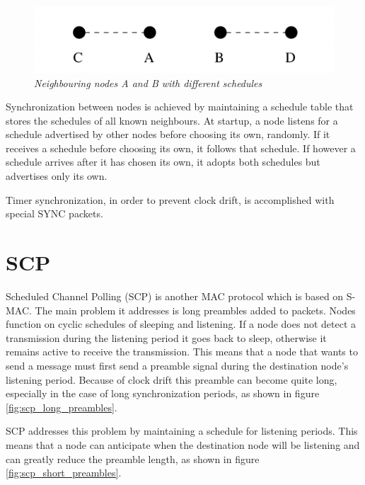 \begin{figure}[ht]
	\begin{center}
		\includegraphics{img/s-mac_schedules.pdf}
	\end{center}
	\caption{\small \itshape{Neighbouring nodes A and B with different
	schedules\protect\footnotemark}}
	\label{fig:s-mac_schedules}
\end{figure}

Synchronization between nodes is achieved by maintaining a schedule table that
stores the schedules of all known neighbours. At startup, a node listens for a
schedule advertised by other nodes before choosing its own, randomly. If it
receives a schedule before choosing its own, it follows that schedule. If
however a schedule arrives after it has chosen its own, it adopts both schedules
but advertises only its own.

Timer synchronization, in order to prevent clock drift, is
accomplished with special SYNC packets.

\section{SCP}

Scheduled Channel Polling\cite{ye2006ultra} (SCP) is another MAC protocol which
is based on S-MAC. The main problem it addresses is long preambles added to
packets. Nodes function on cyclic schedules of sleeping and listening. If a
node does not detect a transmission during the listening period it goes back to
sleep, otherwise it remains active to receive the transmission. This means that
a node that wants to send a message must first send a preamble signal during
the destination node's listening period. Because of clock drift this preamble
can become quite long, especially in the case of long synchronization periods,
as shown in figure \ref{fig:scp_long_preambles}.

SCP addresses this problem by maintaining a schedule for listening periods.
This means that a node can anticipate when the destination node will be
listening and can greatly reduce the preamble length, as shown in figure
\ref{fig:scp_short_preambles}.

